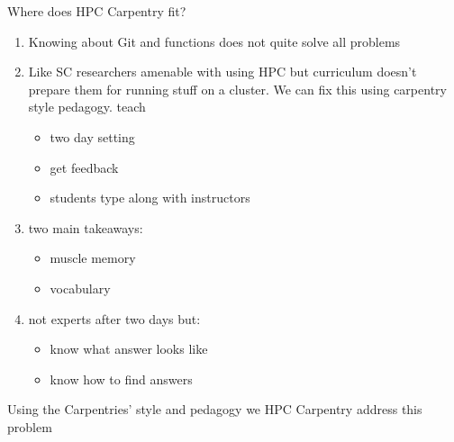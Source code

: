 \begin{frame}{Where does HPC Carpentry fit?}
	\begin{enumerate}
		\item Knowing about Git and functions does not quite solve all problems
		\item Like SC researchers amenable with using HPC but curriculum doesn't prepare them for running stuff on a cluster. We can fix this using carpentry style pedagogy.
		teach
		\begin{itemize}
			\item two day setting
			\item get feedback
			\item students type along with instructors
		\end{itemize}
		\item two main takeaways:
			\begin{itemize}
				\item muscle memory 
				\item vocabulary
			\end{itemize}
		\item not experts after two days but:
			\begin{itemize}
				\item know what answer looks like
				\item know how to find answers
			\end{itemize} 
	\end{enumerate}
	
	\note[item]Using the Carpentries' style and pedagogy we HPC Carpentry address this problem
\end{frame}